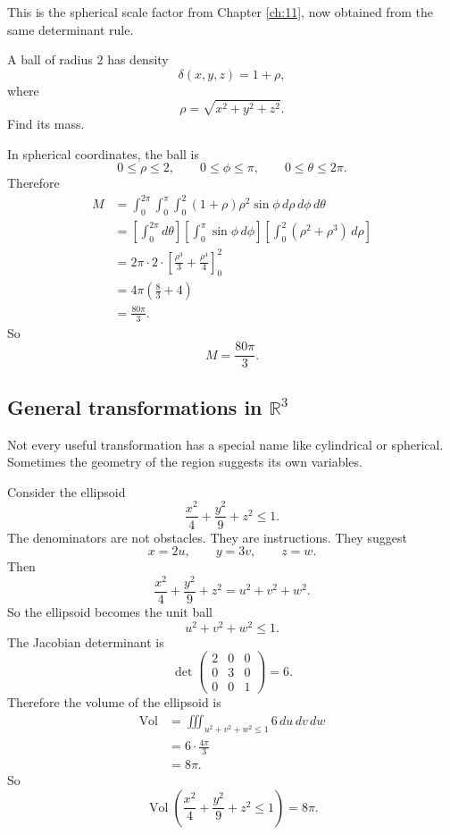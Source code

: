 This is the spherical scale factor from Chapter \ref{ch:11}, now obtained from the
same determinant rule.

\begin{example}
A ball of radius \(2\) has density
\[
    \delta(x,y,z)=1+\rho,
\]
where
\[
    \rho=\sqrt{x^2+y^2+z^2}.
\]
Find its mass.

In spherical coordinates, the ball is
\[
    0\le\rho\le2,
    \qquad
    0\le\phi\le\pi,
    \qquad
    0\le\theta\le2\pi.
\]
Therefore
\[
\begin{aligned}
    M
    &=
    \int_0^{2\pi}\int_0^\pi\int_0^2
    (1+\rho)\rho^2\sin\phi\,d\rho\,d\phi\,d\theta\\
    &=
    \left[\int_0^{2\pi}d\theta\right]
    \left[\int_0^\pi\sin\phi\,d\phi\right]
    \left[\int_0^2(\rho^2+\rho^3)\,d\rho\right]\\
    &=
    2\pi\cdot2\cdot
    \left[
        \frac{\rho^3}{3}+\frac{\rho^4}{4}
    \right]_0^2\\
    &=
    4\pi\left(\frac83+4\right)\\
    &=
    \frac{80\pi}{3}.
\end{aligned}
\]
So
\[
\boxed{
    M=\frac{80\pi}{3}.
}
\]
\end{example}

\subsection{General transformations in \texorpdfstring{\(\mathbb R^3\)}{R3}}

Not every useful transformation has a special name like cylindrical or spherical.
Sometimes the geometry of the region suggests its own variables.

Consider the ellipsoid
\[
    \frac{x^2}{4}+\frac{y^2}{9}+z^2\le1.
\]
The denominators are not obstacles.  They are instructions.  They suggest
\[
    x=2u,
    \qquad
    y=3v,
    \qquad
    z=w.
\]
Then
\[
    \frac{x^2}{4}+\frac{y^2}{9}+z^2
    =
    u^2+v^2+w^2.
\]
So the ellipsoid becomes the unit ball
\[
    u^2+v^2+w^2\le1.
\]
The Jacobian determinant is
\[
    \det
    \begin{pmatrix}
        2&0&0\\
        0&3&0\\
        0&0&1
    \end{pmatrix}
    =
    6.
\]
Therefore the volume of the ellipsoid is
\[
\begin{aligned}
    \operatorname{Vol}
    &=
    \iiint_{u^2+v^2+w^2\le1}6\,du\,dv\,dw\\
    &=
    6\cdot \frac{4\pi}{3}\\
    &=
    8\pi.
\end{aligned}
\]
So
\[
\boxed{
    \operatorname{Vol}\left(
    \frac{x^2}{4}+\frac{y^2}{9}+z^2\le1
    \right)
    =
    8\pi.
}
\]

